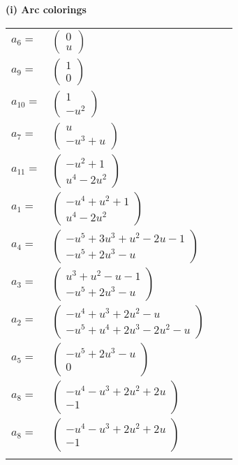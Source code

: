 \documentclass[1p]{elsarticle_modified}
\theoremstyle{definition}
\begin{document}
\flushleft \textbf{(i) Arc colorings}\\
\begin{tabular}{m{7pt} m{180pt} m{7pt} m{180pt} }
\flushright $a_{6}=$&$\begin{pmatrix}0\\u\end{pmatrix}$ \\
\flushright $a_{9}=$&$\begin{pmatrix}1\\0\end{pmatrix}$ \\
\flushright $a_{10}=$&$\begin{pmatrix}1\\- u^2\end{pmatrix}$ \\
\flushright $a_{7}=$&$\begin{pmatrix}u\\- u^3+u\end{pmatrix}$ \\
\flushright $a_{11}=$&$\begin{pmatrix}- u^2+1\\u^4-2 u^2\end{pmatrix}$ \\
\flushright $a_{1}=$&$\begin{pmatrix}- u^4+u^2+1\\u^4-2 u^2\end{pmatrix}$ \\
\flushright $a_{4}=$&$\begin{pmatrix}- u^5+3 u^3+u^2-2 u-1\\- u^5+2 u^3- u\end{pmatrix}$ \\
\flushright $a_{3}=$&$\begin{pmatrix}u^3+u^2- u-1\\- u^5+2 u^3- u\end{pmatrix}$ \\
\flushright $a_{2}=$&$\begin{pmatrix}- u^4+u^3+2 u^2- u\\- u^5+u^4+2 u^3-2 u^2- u\end{pmatrix}$ \\
\flushright $a_{5}=$&$\begin{pmatrix}- u^5+2 u^3- u\\0\end{pmatrix}$ \\
\flushright $a_{8}=$&$\begin{pmatrix}- u^4- u^3+2 u^2+2 u\\-1\end{pmatrix}$\\ \flushright $a_{8}=$&$\begin{pmatrix}- u^4- u^3+2 u^2+2 u\\-1\end{pmatrix}$\\&\end{tabular}
\end{document}
